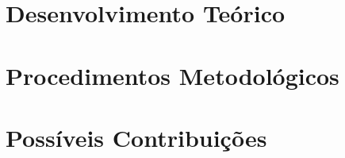 \documentclass[
	oneside,
	12pt,				%
	a4paper,			%
	english,			%
	brazil,				%
	article
	]{abntex2}
\begin{document}
\section{Desenvolvimento Teórico}

\section{Procedimentos Metodológicos}

\section{Possíveis Contribuições}




\end{document}
